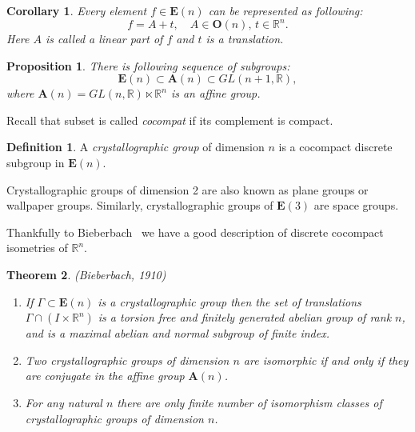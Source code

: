\documentclass[a4paper,12pt]{amsart}
\newtheorem{theorem}{Theorem}
\newtheorem{proposition}[theorem]{Proposition}
\newtheorem{corollary}{Corollary}[theorem]
\theoremstyle{definition}
\newtheorem{definition}{Definition}
\begin{document}
	\begin{corollary}
		Every element $f \in \mathbf{E}(n)$ can be represented as following: 
		$$
		f = A + t, \quad A \in \mathbf{O}(n), \, t \in \mathbb{R}^n.
		$$
		Here $A$ is called a linear part of $f$ and $t$ is a translation.
	\end{corollary}
	
	
	\begin{proposition}
		There is following sequence of subgroups: 
		$$
		\mathbf{E}(n) \subset \mathbf{A}(n) \subset GL(n + 1, \mathbb{R}),
		$$
		where $\mathbf{A}(n) = GL(n, \mathbb{R}) \ltimes \mathbb{R}^n$ is an affine group.
	\end{proposition}
	
	Recall that subset is called \textit{cocompat} if its complement is compact.
	
	\begin{definition}
		A \textit{crystallographic group} of dimension $n$ is a cocompact discrete subgroup in $\mathbf{E}(n)$.
		
		Crystallographic groups of dimension 2 are also known as plane groups or wallpaper groups. Similarly, crystallographic groups of $\mathbf{E}(3)$ are space groups. 
		
	\end{definition}
	
	Thankfully to Bieberbach~\cite{Bieberbach:Original} we have a good description of discrete cocompact isometries of $\mathbb{R}^n$.
	
	\begin{theorem}
		(Bieberbach, 1910)
		\begin{enumerate}[label=\arabic*.]
			\item If $\Gamma \subset \mathbf{E}(n)$ is a crystallographic group then the set of translations $\Gamma \cap (I \times \mathbb{R}^n)$ is a torsion free and finitely generated abelian group of rank $n$, and is a maximal abelian and normal subgroup of finite index.
			\item Two crystallographic groups of dimension $n$ are isomorphic if and only if they are conjugate in the affine group $\mathbf{A}(n)$.
			
			\item For any natural $n$ there are only finite number of isomorphism classes of crystallographic groups of dimension $n$.			
		\end{enumerate}
		
	
	\end{theorem}
	
\end{document}
